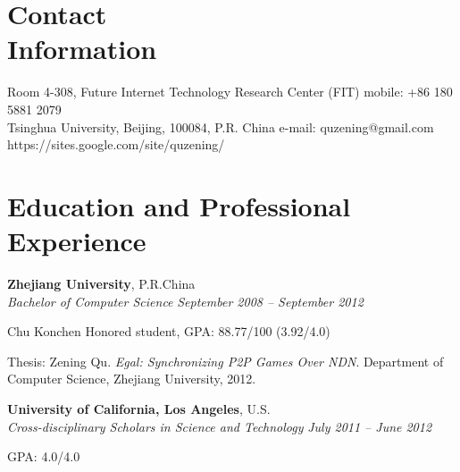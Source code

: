 \documentclass[margin,line]{resume}
\begin{document}
\begin{resume}

    \section{\mysidestyle Contact\\Information}

    Room 4-308, Future Internet Technology Research Center (FIT)                          
    \hfill mobile: +86 180 5881 2079         \vspace{0mm}\\\vspace{0mm}%
    Tsinghua University, Beijing, 100084, P.R. China                         
    \hfill e-mail: quzening@gmail.com          
    \vspace{0mm} \\ \vspace{0mm}
    \hfill 
    https://sites.google.com/site/quzening/

    \section{\mysidestyle Education and Professional Experience}

    \textbf{Zhejiang University}, P.R.China \vspace{2mm}\\\vspace{1mm}%
    \textsl{Bachelor of Computer Science} \hfill \textsl{September 2008 -- September 2012}\vspace{-3mm}\\\vspace{-1mm}%
    \begin{list2}
        \item Chu Konchen Honored student, GPA: 88.77/100 (3.92/4.0)
        \item Thesis: Zening Qu. \textsl{Egal: Synchronizing P2P Games Over NDN}. Department of Computer Science, Zhejiang University, 2012.
    \end{list2}\vspace{-1.5mm}
    
    \textbf{University of California, Los Angeles}, U.S. \vspace{2mm}\\\vspace{1mm}%
    \textsl{Cross-disciplinary Scholars in Science and Technology} \hfill \textsl{July 2011 -- June 2012}\vspace{-3mm}\\\vspace{-1mm}%
    \begin{list2}
        \item GPA: 4.0/4.0
    \end{list2}\vspace{-1.5mm}


\end{resume}
\end{document}
